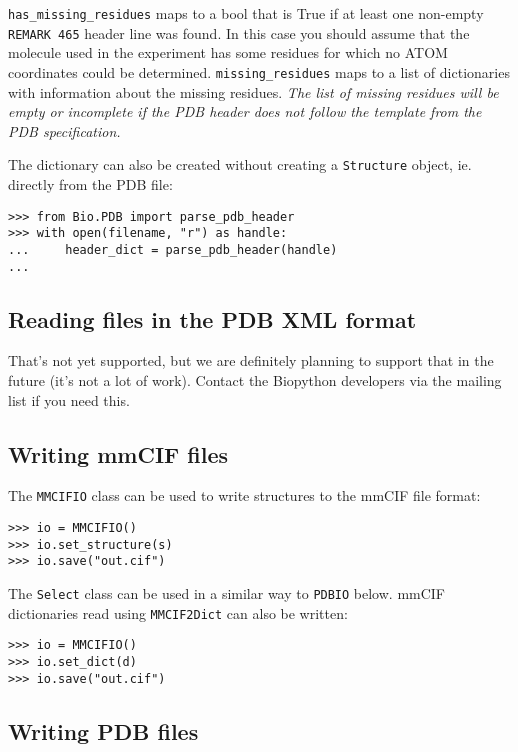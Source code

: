 \verb+has_missing_residues+ maps to a bool that is True if at least
one non-empty \verb+REMARK 465+ header line was found. In this case
you should assume that the molecule used in the experiment has some 
residues for which no ATOM coordinates could be determined. 
\verb+missing_residues+ maps to a list of dictionaries with information
about the missing residues. \emph{The list of missing residues will be
empty or incomplete if the PDB header does not follow the template from
the PDB specification.}

The dictionary can also be created without creating a \texttt{Structure}
object, ie. directly from the PDB file:

\begin{verbatim}
>>> from Bio.PDB import parse_pdb_header
>>> with open(filename, "r") as handle:
...     header_dict = parse_pdb_header(handle)
...
\end{verbatim}

\subsection{Reading files in the PDB XML format}

That's not yet supported, but we are definitely planning to support that
in the future (it's not a lot of work). Contact the Biopython developers
via the mailing list if you need this.


\subsection{Writing mmCIF files}

The \texttt{MMCIFIO} class can be used to write structures to the mmCIF file format:

\begin{verbatim}
>>> io = MMCIFIO()
>>> io.set_structure(s)
>>> io.save("out.cif")
\end{verbatim}
The \texttt{Select} class can be used in a similar way to \texttt{PDBIO} below.
mmCIF dictionaries read using \texttt{MMCIF2Dict} can also be written:

\begin{verbatim}
>>> io = MMCIFIO()
>>> io.set_dict(d)
>>> io.save("out.cif")
\end{verbatim}

\subsection{Writing PDB files}

